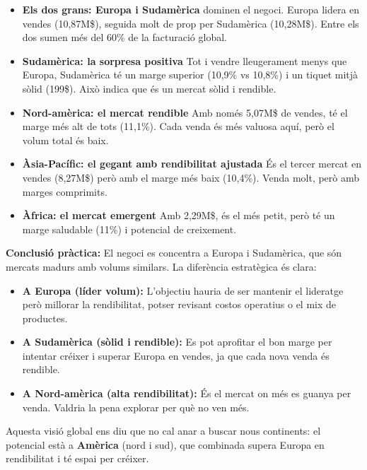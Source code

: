 \documentclass[12pt,a4paper]{article}
\begin{document}
\begin{itemize}
    \item \textbf{Els dos grans: Europa i Sudamèrica} dominen el negoci. Europa lidera en vendes (10,87M\$), seguida molt de prop per Sudamèrica (10,28M\$). Entre els dos sumen més del 60\% de la facturació global.
    
    \item \textbf{Sudamèrica: la sorpresa positiva} Tot i vendre lleugerament menys que Europa, Sudamèrica té un marge superior (10,9\% vs 10,8\%) i un tiquet mitjà sòlid (199\$). Això indica que és un mercat sòlid i rendible.
    
    \item \textbf{Nord-amèrica: el mercat rendible} Amb només 5,07M\$ de vendes, té el marge més alt de tots (11,1\%). Cada venda és més valuosa aquí, però el volum total és baix.
    
    \item \textbf{Àsia-Pacífic: el gegant amb rendibilitat ajustada} És el tercer mercat en vendes (8,27M\$) però amb el marge més baix (10,4\%). Venda molt, però amb marges comprimits.
    
    \item \textbf{Àfrica: el mercat emergent} Amb 2,29M\$, és el més petit, però té un marge saludable (11\%) i potencial de creixement.
\end{itemize}

\textbf{Conclusió pràctica:} El negoci es concentra a Europa i Sudamèrica, que són mercats madurs amb volums similars. La diferència estratègica és clara:

\begin{itemize}
    \item \textbf{A Europa (líder volum):} L'objectiu hauria de ser mantenir el lideratge però millorar la rendibilitat, potser revisant costos operatius o el mix de productes.
    
    \item \textbf{A Sudamèrica (sòlid i rendible):} Es pot aprofitar el bon marge per intentar créixer i superar Europa en vendes, ja que cada nova venda és rendible.
    
    \item \textbf{A Nord-amèrica (alta rendibilitat):} És el mercat on més es guanya per venda. Valdria la pena explorar per què no ven més.
\end{itemize}

Aquesta visió global ens diu que no cal anar a buscar nous continents: el potencial està a \textbf{Amèrica} (nord i sud), que combinada supera Europa en rendibilitat i té espai per créixer.
\end{document}
